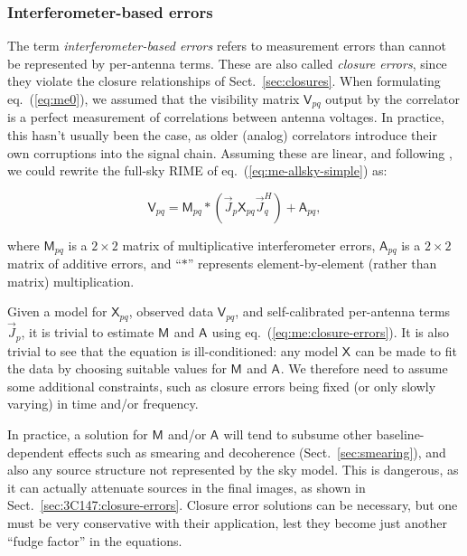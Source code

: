 \documentclass[]{aa}
\newcommand{\herm}{H}
\newcommand{\jones}[2]{\vec {#1}_{#2}}
\newcommand{\jonesT}[2]{\vec {#1}^{\herm}_{#2}}
\newcommand{\coh}[2]{\mathsf{{#1}}_{{#2}}}
\begin{document}
\subsubsection{\label{sec:closure-errors}Interferometer-based errors}

The term {\em interferometer-based errors} refers to measurement errors than cannot be represented by per-antenna terms.
These are also called {\em closure errors}, since they violate the closure relationships of Sect.~\ref{sec:closures}. When formulating eq.~(\ref{eq:me0}), we assumed that the visibility matrix $\coh{V}{pq}$ output by the correlator is a perfect measurement of correlations between antenna voltages. In practice, this hasn't usually been the case, as older (analog) correlators introduce their own corruptions into the signal chain. Assuming these are linear, and following \citet{JEN:note185}, we could rewrite the full-sky RIME of eq.~(\ref{eq:me-allsky-simple}) as: 

    \begin{equation}\label{eq:me:closure-errors}
    \coh{V}{pq} = \coh{M}{pq} \ast ( \jones{J}{p} \coh{X}{pq}  \jonesT{J}{q} ) + \coh{A}{pq},
    \end{equation}

where $\coh{M}{pq}$ is a $2\times2$ matrix of multiplicative interferometer errors, $\coh{A}{pq}$ is a $2\times2$ matrix of additive errors, and ``$\ast$'' represents element-by-element (rather than matrix) multiplication.

Given a model for $\coh{X}{pq}$, observed data $\coh{V}{pq}$, and self-calibrated per-antenna terms $\jones{J}{p}$, it is trivial to estimate $\coh{M}{}$ and $\coh{A}{}$ using eq.~(\ref{eq:me:closure-errors}). It is also trivial to see that the equation is ill-conditioned: any model $\coh{X}{}$ can be made to fit the data by choosing suitable values for $\coh{M}{}$ and $\coh{A}{}$. We therefore need to assume some additional constraints, such as closure errors being fixed (or only slowly varying) in time and/or frequency. 

In practice, a solution for $\coh{M}{}$ and/or $\coh{A}{}$ will tend to subsume other baseline-dependent effects such as smearing and decoherence (Sect.~\ref{sec:smearing}), and also any source structure not represented by the sky model. This is dangerous, as it can actually attenuate sources in the final images, as shown in Sect.~\ref{sec:3C147:closure-errors}. Closure error solutions can be necessary, but one must be very conservative with their application, lest they become just another ``fudge factor'' in the equations.
\end{document}
